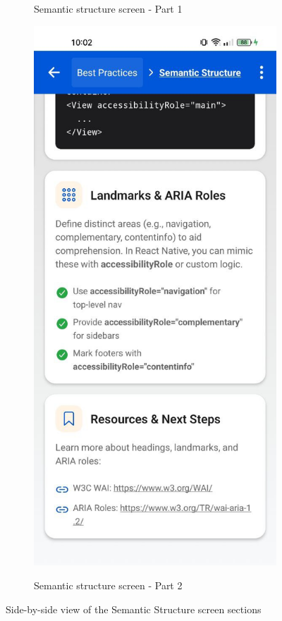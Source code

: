 \begin{figure}[ht]
\begin{subfigure}[b]{0.48\textwidth}
        \caption{Semantic structure screen - Part 1}
        \label{fig:semantics-left}
    \end{subfigure}
    \hfill
    \begin{subfigure}[b]{0.48\textwidth}
        \centering
        \includegraphics[width=\linewidth, alt={Second part of the Semantic Structure Screen}]{img/semantics2.jpg}
        \caption{Semantic structure screen - Part 2}
        \label{fig:semantics-right}
    \end{subfigure}
    \caption{Side-by-side view of the Semantic Structure screen sections}
    \label{fig:semantics_screens_sidebyside}
\end{figure}

